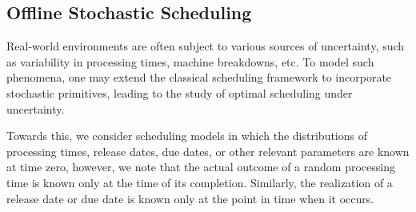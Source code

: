 \subsection{Offline Stochastic Scheduling}

Real-world environments are often subject to various sources of uncertainty, such as variability in processing times, machine breakdowns, etc. To model such phenomena, one may extend the classical scheduling framework to incorporate stochastic primitives, leading to the study of optimal scheduling under uncertainty.

Towards this, we consider scheduling models in which the distributions of processing times, release dates, due dates, or other relevant parameters are known at time zero, however, we note that the actual outcome of a random processing time is known only at the time of its completion. Similarly, the realization of a release date or due date is known only at the point in time when it occurs. 


